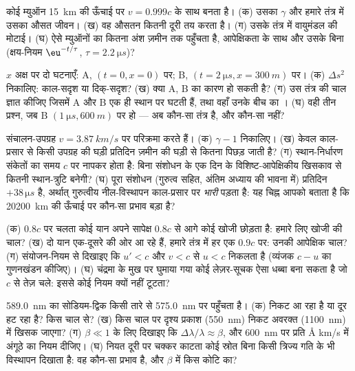 \begin{exercise}[$\star$]\label{exo:b3:relativistic-kinematics:3}
कोई म्युऑन \qty{15}{km} की ऊँचाई पर $v = 0.999c$ के साथ बनता है। (क)
उसका $\gamma$ और हमारे तंत्र में उसका औसत जीवन। (ख) वह औसतन कितनी दूरी
तय करता है। (ग) उसके तंत्र में वायुमंडल की मोटाई। (घ) ऐसे म्युऑनों का
कितना अंश ज़मीन तक पहुँचता है, आपेक्षिकता के साथ और उसके बिना (क्षय-नियम
$\eu^{-t/\tau}$, $\tau = \qty{2.2}{\micro s}$)?
\end{exercise}

\begin{exercise}[$\star$]\label{exo:b3:relativistic-kinematics:4}
$x$ अक्ष पर दो घटनाएँ: A, $(t = 0, x = 0)$ पर; B, $(t =
\qty{2}{\micro s}, x = \qty{300}{m})$ पर। (क) $\Delta s^2$ निकालिए:
काल-सदृश या दिक्-सदृश? (ख) क्या A, B का कारण हो सकती है? (ग) उस तंत्र
की चाल ज्ञात कीजिए जिसमें A और B एक ही स्थान पर घटती हैं, तथा वहाँ
उनके बीच का । (घ) वही तीन प्रश्न, जब B
$(\qty{1}{\micro s}, \qty{600}{m})$ पर हो --- अब कौन-सा तंत्र है, और
कौन-सा नहीं?
\end{exercise}

\begin{exercise}[$\star\star$]\label{exo:b3:relativistic-kinematics:5}
संचालन-उपग्रह $v = \qty{3.87}{km/s}$ पर परिक्रमा करते हैं। (क) $\gamma -
1$ निकालिए। (ख) केवल काल-प्रसार से किसी उपग्रह की घड़ी प्रतिदिन
ज़मीन की घड़ी से कितना पिछड़ जाती है? (ग) स्थान-निर्धारण संकेतों का
समय $c$ पर नापकर होता है: बिना संशोधन के एक दिन के विशिष्ट-आपेक्षिकीय
खिसकाव से कितनी स्थान-त्रुटि बनेगी? (घ) पूरा संशोधन (गुरुत्व सहित,
अंतिम अध्याय की भावना में) प्रतिदिन $+38\,\unit{\micro s}$ है, अर्थात्
गुरुत्वीय नील-विस्थापन काल-प्रसार पर \emph{भारी} पड़ता है:
यह चिह्न आपको बताता है कि \qty{20200}{km} की ऊँचाई पर कौन-सा प्रभाव
बड़ा है?
\end{exercise}

\begin{exercise}[$\star\star$]\label{exo:b3:relativistic-kinematics:6}
(क) $0.8c$ पर चलता कोई यान अपने सापेक्ष $0.8c$ से आगे कोई खोजी छोड़ता
है: हमारे लिए खोजी की चाल? (ख) दो यान एक-दूसरे की ओर आ रहे हैं, हमारे
तंत्र में हर एक $0.9c$ पर: उनकी आपेक्षिक चाल? (ग) संयोजन-नियम से
दिखाइए कि $u' < c$ और $v < c$ से $u < c$ निकलता है (व्यंजक
$c - u$ का गुणनखंडन कीजिए)। (घ) चंद्रमा के मुख पर घुमाया गया कोई
लेज़र-सूचक ऐसा धब्बा बना सकता है जो $c$ से तेज़ चले: इससे कोई नियम
क्यों नहीं टूटता?
\end{exercise}

\begin{exercise}[$\star\star$]\label{exo:b3:relativistic-kinematics:7}
\qty{589.0}{nm} का सोडियम-द्विक किसी तारे से
\qty{575.0}{nm} पर पहुँचता है। (क) निकट आ रहा है या दूर हट रहा है? किस
चाल से? (ख) किस चाल पर दृश्य प्रकाश (\qty{550}{nm}) निकट अवरक्त
(\qty{1100}{nm}) में खिसक जाएगा? (ग) $\beta \ll 1$ के लिए दिखाइए कि
$\Delta\lambda/\lambda \approx \beta$, और \qty{600}{nm} पर प्रति
\unit{\angstrom} km/s में अंगूठे का नियम दीजिए। (घ) नियत दूरी पर चक्कर
काटता कोई स्रोत बिना किसी त्रिज्य गति के भी विस्थापन दिखाता है: वह
कौन-सा प्रभाव है, और $\beta$ में किस कोटि का?
\end{exercise}

